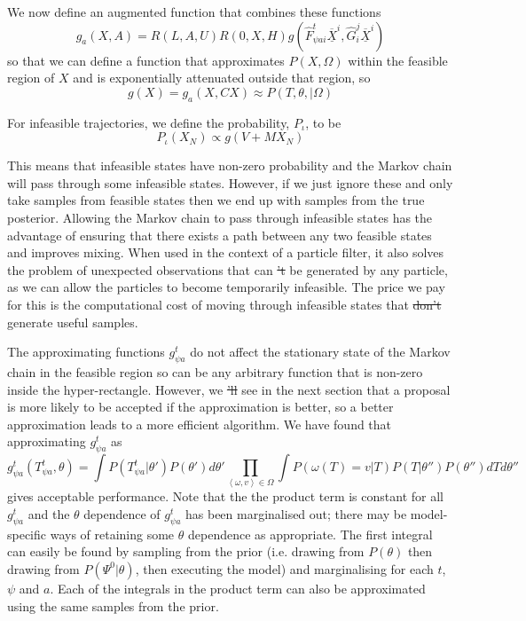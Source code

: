 \documentclass{article}
\providecommand{\DIFaddtex}[1]{{\protect\color{blue}\uwave{#1}}} %
\providecommand{\DIFdeltex}[1]{{\protect\color{red}\sout{#1}}}                      %
\providecommand{\DIFaddbegin}{} %
\providecommand{\DIFaddend}{} %
\providecommand{\DIFdelbegin}{} %
\providecommand{\DIFdelend}{} %
\providecommand{\DIFadd}[1]{\texorpdfstring{\DIFaddtex{#1}}{#1}} %
\providecommand{\DIFdel}[1]{\texorpdfstring{\DIFdeltex{#1}}{}} %
\newcommand{\DIFscaledelfig}{0.5}
\newlength{\DIFdelgraphicswidth} %
\newlength{\DIFdelgraphicsheight} %
\newcommand{\DIFaddincludegraphics}[2][]{{\color{blue}\fbox{\DIFOincludegraphics[#1]{#2}}}} %
\newcommand{\DIFdelincludegraphics}[2][]{%
\sbox{\DIFdelgraphicsbox}{\DIFOincludegraphics[#1]{#2}}%
\settoboxwidth{\DIFdelgraphicswidth}{\DIFdelgraphicsbox} %
\settoboxtotalheight{\DIFdelgraphicsheight}{\DIFdelgraphicsbox} %
\scalebox{\DIFscaledelfig}{%
\parbox[b]{\DIFdelgraphicswidth}{\usebox{\DIFdelgraphicsbox}\\[-\baselineskip] \rule{\DIFdelgraphicswidth}{0em}}\llap{\resizebox{\DIFdelgraphicswidth}{\DIFdelgraphicsheight}{%
\setlength{\unitlength}{\DIFdelgraphicswidth}%
\begin{picture}(1,1)%
\thicklines\linethickness{2pt} %
{\color[rgb]{1,0,0}\put(0,0){\framebox(1,1){}}}%
{\color[rgb]{1,0,0}\put(0,0){\line( 1,1){1}}}%
{\color[rgb]{1,0,0}\put(0,1){\line(1,-1){1}}}%
\end{picture}%
}\hspace*{3pt}}} %
} %
\DeclareRobustCommand{\DIFaddbegin}{\DIFOaddbegin \let\includegraphics\DIFaddincludegraphics} %
\DeclareRobustCommand{\DIFaddend}{\DIFOaddend \let\includegraphics\DIFOincludegraphics} %
\DeclareRobustCommand{\DIFdelbegin}{\DIFOdelbegin \let\includegraphics\DIFdelincludegraphics} %
\DeclareRobustCommand{\DIFdelend}{\DIFOaddend \let\includegraphics\DIFOincludegraphics} %
\begin{document}
We now define an augmented function that combines these functions
\begin{equation}
g_a(X,A) = R\left(L,A,U\right)R(0,X,H)g\left(\hat{F}^t_{\psi a i}\overline{\underline{X}}^i, \hat{G}^j_i\overline{\underline{X}}^i\right)
\label{augmentedG}
\end{equation}
so that we can define a function that approximates $P(X,\Omega)$ within the feasible region of $X$ and is exponentially attenuated outside that region, so 
\[
g(X) = g_a\left(X,CX\right) \approx P(T,\theta,|\Omega)
\]

For infeasible trajectories, we define the probability, $P_\iota$, to be
\begin{equation}
P_\iota(X_N) \propto g(V+MX_N)
\label{loglinprob}
\end{equation}

This means that infeasible states have non-zero probability and the Markov chain will pass through some infeasible states.  However, if we just ignore these and only take samples from feasible states then we end up with samples from the true posterior. Allowing the Markov chain to pass through infeasible states has the advantage of ensuring that there exists a path between any two feasible states and improves mixing. When used in the context of a particle filter, it also solves the problem of unexpected observations that can \DIFdelbegin \DIFdel{'t }\DIFdelend \DIFaddbegin \DIFadd{not }\DIFaddend be generated by any particle, as we can allow the particles to become temporarily infeasible. The price we pay for this is the computational cost of moving through infeasible states that \DIFdelbegin \DIFdel{don't }\DIFdelend \DIFaddbegin \DIFadd{do not }\DIFaddend generate useful samples.

The approximating functions $g^t_{\psi a}$ do not affect the stationary state of the Markov chain in the feasible region so can be any arbitrary function that is non-zero inside the hyper-rectangle. However, we \DIFdelbegin \DIFdel{'ll }\DIFdelend see in the next section that a proposal is more likely to be accepted if the approximation is better, so a better approximation leads to a more efficient algorithm. We have found that approximating $g^t_{\psi a}$ as 
\[
g^t_{\psi a}(T^t_{\psi a},\theta) = \int P(T^t_{\psi a}|\theta')P(\theta')d\theta' \prod_{\left<\omega,v\right> \in \Omega} \int P(\omega(T)=v|T)P(T|\theta'')P(\theta'') dT  d\theta''
\]
gives acceptable performance. Note that the the product term is constant for all $g^t_{\psi a}$ and the $\theta$ dependence of $g^t_{\psi a}$ has been marginalised out; there may be model-specific ways of retaining some $\theta$ dependence as appropriate. The first integral can easily be found by sampling from the prior (i.e. drawing from $P(\theta)$  then drawing from $P(\Psi^0|\theta)$, then executing the model) and marginalising for each $t$, $\psi$ and $a$. Each of the integrals in the product term can also be approximated using the same samples from the prior.
\end{document}
